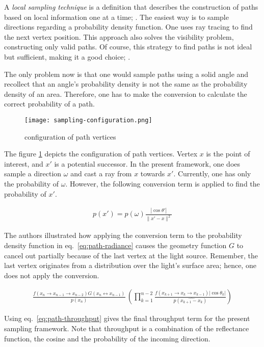 A \textit{local sampling technique} is a definition that describes the construction of paths based on local information one at a time; \cite{veach_robust_1997}.
The easiest way is to sample directions regarding a probability density function.
One uses ray tracing to find the next vertex position.
This approach also solves the visibility problem, constructing only valid paths.
Of course, this strategy to find paths is not ideal but sufficient, making it a good choice; \cite{pharr_physically_2017}.

The only problem now is that one would sample paths using a solid angle and recollect that an angle's probability density is not the same as the probability density of an area.
Therefore, one has to make the conversion to calculate the correct probability of a path.

\begin{figure}[h]
\centering
\texttt{[image: sampling-configuration.png]}
\caption[]{configuration of path vertices}
\label{fig:path-vertices}
\end{figure}

The figure \ref{fig:path-vertices} depicts the configuration of path vertices.
Vertex $x$ is the point of interest, and $x'$ is a potential successor.
In the present framework, one does sample a direction $\omega$ and cast a ray from $x$ towards $x'$.
Currently, one has only the probability of $\omega$. 
However, the following conversion term is applied to find the probability of $x'$.

\begin{align*}
p(x')=p(\omega)\frac{|\cos\theta'|}{\|x'-x\|^2}
\end{align*}

The authors \cite{pharr_physically_2017} illustrated how applying the conversion term to the probability density function in eq.~\ref{eq:path-radiance} causes the geometry function $G$ to cancel out partially because of the last vertex at the light source.
Remember, the last vertex originates from a distribution over the light's surface area; hence, one does not apply the conversion.

\begin{align*}
\frac{f(x_{n}\rightarrow x_{n-1}\rightarrow x_{n-2})G(x_n\leftrightarrow x_{n-1})}{p(x_n)}\,\left(\prod_{k=1}^{n-2}\frac{f(x_{k+1}\rightarrow x_{k}\rightarrow x_{k-1})|\cos\theta_{k}|}{p(\widehat{x_{k+1}-x_{k}})}\right)
\end{align*}

Using eq.~\ref{eq:path-throughput} gives the final throughput term for the present sampling framework.
Note that throughput is a combination of the reflectance function, the cosine and the probability of the incoming direction.


